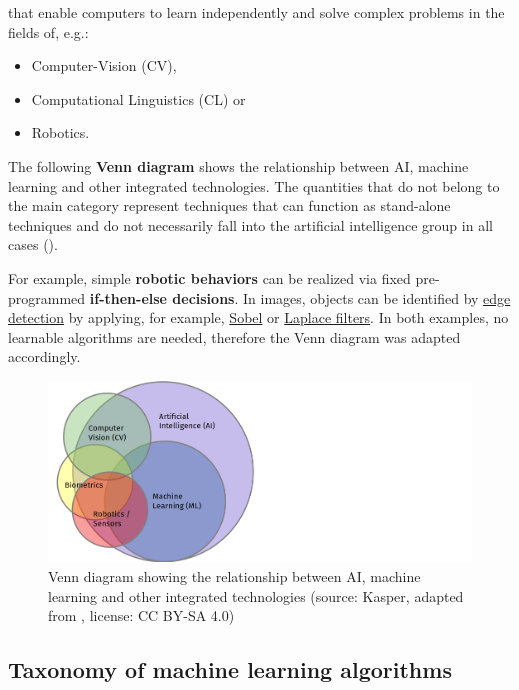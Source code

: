 \documentclass [oneside,10pt,a4paper,ngerman,BCOR10mm,headsepline,parindent,final]{scrartcl}
\providecommand{\tightlist}{%
      \setlength{\itemsep}{0pt}\setlength{\parskip}{0pt}}
\begin{document}
that enable computers to learn independently and solve complex problems
in the fields of, e.g.:

\begin{itemize}
\tightlist
\item
  Computer-Vision (CV),
\item
  Computational Linguistics (CL) or
\item
  Robotics.
\end{itemize}

The following \textbf{Venn diagram} shows the relationship between AI,
machine learning and other integrated technologies. The quantities that
do not belong to the main category represent techniques that can
function as stand-alone techniques and do not necessarily fall into the
artificial intelligence group in all cases (\cite{AI_beverages_2019}).

For example, simple \textbf{robotic behaviors} can be realized via fixed
pre-programmed \textbf{if-then-else decisions}. In images, objects can
be identified by
\href{https://en.wikipedia.org/wiki/Edge_detection}{edge detection} by
applying, for example,
\href{https://en.wikipedia.org/wiki/Sobel_operator}{Sobel} or
\href{https://en.wikipedia.org/wiki/Laplace_operator}{Laplace filters}.
In both examples, no learnable algorithms are needed, therefore the Venn
diagram was adapted accordingly.

    \begin{figure}
\centering
\includegraphics{images/AI_ML_venn_diagram_wide.png}
\caption{Venn diagram showing the relationship between AI, machine
learning and other integrated technologies (source: Kasper, adapted from
\cite{AI_beverages_2019}, license: CC BY-SA 4.0)}
\end{figure}

    \hypertarget{taxonomy-of-machine-learning-algorithms}{%
\subsection{Taxonomy of machine learning
algorithms}\label{taxonomy-of-machine-learning-algorithms}}
\end{document}
